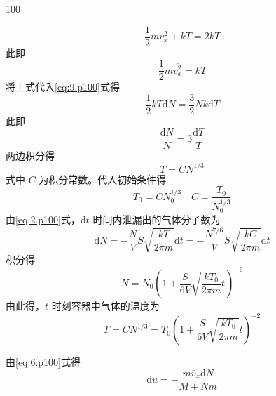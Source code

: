 \begin{solution}{100}
\begin{subsolution}
\begin{equation*}
            \frac {1}{2} m \overline {{v _ {x} ^ {2}}} + k T = 2 k T
        \end{equation*}
        此即
        \begin{equation*}
            \frac {1}{2} m \overline {{v _ {x} ^ {2}}} = k T
        \end{equation*}
        将上式代入\eqref{eq:9.p100}式得
        \begin{equation*}
            \frac {1}{2} k T \mathrm{d} N = \frac {3}{2} N k \mathrm{d} T
        \end{equation*}
        此即
        \begin{equation}
            \frac {\mathrm{d} N}{N} = 3 \frac {\mathrm{d} T}{T}
            \label{eq:10.p100}
        \end{equation}
        两边积分得
        \begin{equation}
            T = C N ^ {1 / 3}
            \label{eq:11.p100}
        \end{equation}
        式中 $C$ 为积分常数。代入初始条件得
        \begin{equation}
            T _ {0} = C N _ {0} ^ {1 / 3} \quad C = \frac {T _ {0}}{N _ {0} ^ {1 / 3}}
            \label{eq:12.p100}
        \end{equation}
        由\eqref{eq:2.p100}式，$\mathrm{d}t$ 时间内泄漏出的气体分子数为
        \begin{equation}
            \mathrm{d} N = - \frac {N}{V} S \sqrt {\frac {k T}{2 \pi m}} \mathrm{d} t = - \frac {N ^ {7 / 6}}{V} S \sqrt {\frac {k C}{2 \pi m}} \mathrm{d} t
            \label{eq:13.p100}
        \end{equation}
        积分得
        \begin{equation}
            N = N _ {0} \left(1 + \frac {S}{6 V} \sqrt {\frac {k T _ {0}}{2 \pi m} t}\right) ^ {- 6}
            \label{eq:14.p100}
        \end{equation}
        由此得，$t$ 时刻容器中气体的温度为
        \begin{equation}
            T = C N ^ {1 / 3} = T _ {0} \left(1 + \frac {S}{6 V} \sqrt {\frac {k T _ {0}}{2 \pi m}} t\right) ^ {- 2}
            \label{eq:15.p100}
        \end{equation}
    \end{subsolution}
    \begin{subsolution}
        由\eqref{eq:6.p100}式得
        \begin{equation}
            \mathrm{d} u = - \frac {m \overline {{v}} _ {x} \mathrm{d} N}{M + N m}

\end{equation}
\end{subsolution}
\end{solution}
